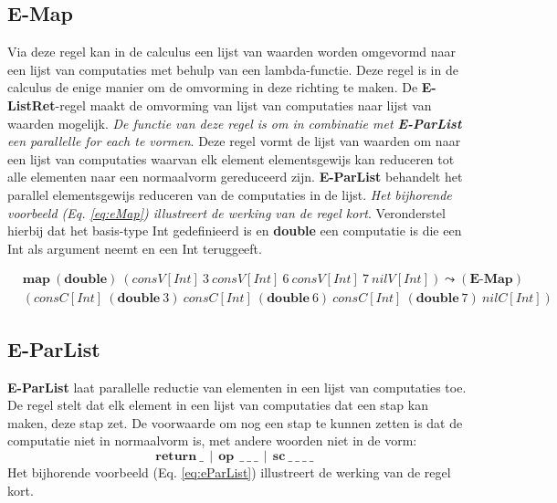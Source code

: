 \subsection{E-Map}
Via deze regel kan in de calculus een lijst van waarden worden omgevormd naar een lijst van computaties met behulp van een lambda-functie. Deze regel is in de calculus de enige manier om de omvorming in deze richting te maken. De \textbf{E-ListRet}-regel maakt de omvorming van lijst van computaties naar lijst van waarden mogelijk. \newline 
\emph{De functie van deze regel is om in combinatie met \textbf{E-ParList} een parallelle for each te vormen}. Deze regel vormt de lijst van waarden om naar een lijst van computaties waarvan elk element elementsgewijs kan reduceren tot alle elementen naar een normaalvorm gereduceerd zijn. \textbf{E-ParList} behandelt het parallel elementsgewijs reduceren van de computaties in de lijst. \newline
\emph{Het bijhorende voorbeeld (Eq. \ref{eq:eMap}) illustreert de werking van de regel kort}. Veronderstel hierbij dat het basis-type Int gedefinieerd is en \textbf{double} een computatie is die een Int als argument neemt en een Int teruggeeft.

\begin{equation}
\label{eq:eMap}
    \begin{split}
        & \textbf{map} \ (\textbf{double}) \ (consV[Int] \ 3 \ consV[Int] \ 6 \ consV[Int] \  7 \ nilV[Int]) \leadsto (\textbf{E-Map})\\
        & (consC[Int] \ (\textbf{double} \ 3) \ consC[Int] \ (\textbf{double} \ 6) \ consC[Int] \ (\textbf{double} \ 7) \ nilC[Int])
    \end{split}
\end{equation}

\subsection{E-ParList}
\textbf{E-ParList} laat parallelle reductie van elementen in een lijst van computaties toe. De regel stelt dat elk element in een lijst van computaties dat een stap kan maken, deze stap zet. 
De voorwaarde om nog een stap te kunnen zetten is dat de computatie niet in normaalvorm is, met andere woorden niet in de vorm:
\begin{equation}
    \textbf{return}\:\_ \:\:|\:\:\textbf{op}\:\:\_\:\_\:\_\:\:|\:\:\textbf{sc}\:\_\:\_\:\_\:\_\:\:%
\end{equation}
Het bijhorende voorbeeld (Eq. \ref{eq:eParList}) illustreert de werking van de regel kort.

